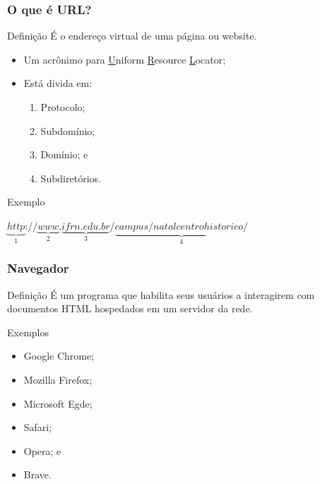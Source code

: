 \documentclass[aspectratio=169]{beamer} %
\begin{document}
\begin{frame}
	\frametitle{O que é URL?}
	
	\begin{block}{Defini\c cão}
		É o endereço virtual de uma página ou website.
	\end{block} \vfill
	
	\begin{itemize}
		\item Um acrônimo para \underline{U}niform \underline{R}esource \underline{L}ocator;
		\item Está divida em: 
		\begin{enumerate}
			\item Protocolo; 
			\item Subdomínio;
			\item Domínio; e 
			\item Subdiretórios.
		\end{enumerate}				
	\end{itemize} \vfill
	
	\begin{exampleblock}{Exemplo}
		\begin{center}
			$\underbrace{http}_{1}$://$\underbrace{www}_{2}$.$\underbrace{ifrn.edu.br}_{3}$/$\underbrace{campus/natalcentrohistorico/}_{4}$
		\end{center}
	\end{exampleblock}
\end{frame}

\begin{frame}
	\frametitle{Navegador}
	
	\begin{block}{Defini\c cão}
		É um programa que habilita seus usuários a interagirem com documentos HTML hospedados em um servidor da rede.
	\end{block} \vfill
	
	\begin{exampleblock}{Exemplos}
		\begin{itemize}
			\item Google Chrome;
			\item Mozilla Firefox;
			\item Microsoft Egde;
			\item Safari;
			\item Opera; e
			\item Brave.
		\end{itemize}
	\end{exampleblock}
\end{frame}
\end{document}
